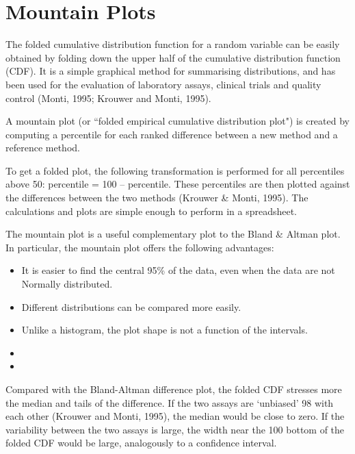 \section{Mountain Plots}

The folded cumulative distribution function for a random variable can be easily obtained by folding down the upper half of the cumulative distribution
function (CDF). It is a simple graphical method for summarising distributions, and has been used for the evaluation of laboratory assays, clinical trials
and quality control (Monti, 1995; Krouwer and Monti, 1995).



A mountain plot (or ``folded empirical cumulative distribution plot") is created by computing a percentile for each ranked difference between a new method and a reference method. 

To get a folded plot, the following transformation is performed for all percentiles above 50: 
percentile = 100 – percentile. These percentiles are then plotted against the differences between 
the two methods (Krouwer \& Monti, 1995). The calculations and plots are simple enough to perform in a spreadsheet. 

The mountain plot is a useful complementary plot to the Bland & Altman plot. 
In particular, the mountain plot offers the following advantages:
\begin{itemize}
\item It is easier to find the central 95\% of the data, even when the data are not Normally distributed.
\item Different distributions can be compared more easily.
\item Unlike a histogram, the plot shape is not a function of the intervals. 
\item
\item
\end{itemize}


Compared with the Bland-Altman diﬀerence plot, the folded CDF stresses more the median and tails of the diﬀerence. If the two assays are ‘unbiased’
98 with each other (Krouwer and Monti, 1995), the median would be close to zero. If the variability between the two assays is large, the width near the
100 bottom of the folded CDF would be large, analogously to a conﬁdence interval.

